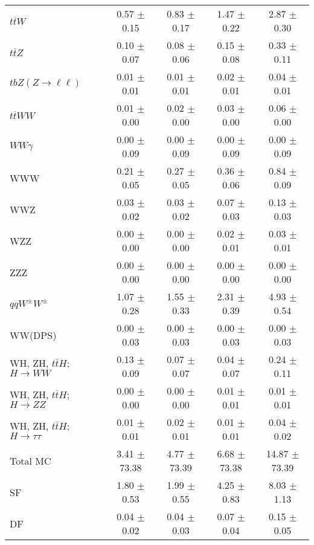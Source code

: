 \begin{tabular}{l|cccc}
                   $t\overline{t}W$ &  0.57 $\pm$  0.15 &  0.83 $\pm$  0.17 &  1.47 $\pm$  0.22 &  2.87 $\pm$  0.30 \\
                   $t\overline{t}Z$ &  0.10 $\pm$  0.07 &  0.08 $\pm$  0.06 &  0.15 $\pm$  0.08 &  0.33 $\pm$  0.11 \\
    $tbZ (Z \rightarrow \ell \ell)$ &  0.01 $\pm$  0.01 &  0.01 $\pm$  0.01 &  0.02 $\pm$  0.01 &  0.04 $\pm$  0.01 \\
                  $t\overline{t}WW$ &  0.01 $\pm$  0.00 &  0.02 $\pm$  0.00 &  0.03 $\pm$  0.00 &  0.06 $\pm$  0.00 \\
                         $WW\gamma$ &  0.00 $\pm$  0.09 &  0.00 $\pm$  0.09 &  0.00 $\pm$  0.09 &  0.00 $\pm$  0.09 \\
                                WWW &  0.21 $\pm$  0.05 &  0.27 $\pm$  0.05 &  0.36 $\pm$  0.06 &  0.84 $\pm$  0.09 \\
                                WWZ &  0.03 $\pm$  0.02 &  0.03 $\pm$  0.02 &  0.07 $\pm$  0.03 &  0.13 $\pm$  0.03 \\
                                WZZ &  0.00 $\pm$  0.00 &  0.00 $\pm$  0.00 &  0.02 $\pm$  0.01 &  0.03 $\pm$  0.01 \\
                                ZZZ &  0.00 $\pm$  0.00 &  0.00 $\pm$  0.00 &  0.00 $\pm$  0.00 &  0.00 $\pm$  0.00 \\
                 $qqW^{\pm}W^{\pm}$ &  1.07 $\pm$  0.28 &  1.55 $\pm$  0.33 &  2.31 $\pm$  0.39 &  4.93 $\pm$  0.54 \\
                            WW(DPS) &  0.00 $\pm$  0.03 &  0.00 $\pm$  0.03 &  0.00 $\pm$  0.03 &  0.00 $\pm$  0.03 \\
WH, ZH, $t\bar{t}H$; $H \rightarrow WW$ &  0.13 $\pm$  0.09 &  0.07 $\pm$  0.07 &  0.04 $\pm$  0.07 &  0.24 $\pm$  0.11 \\
WH, ZH, $t\bar{t}H$; $H \rightarrow ZZ$ &  0.00 $\pm$  0.00 &  0.00 $\pm$  0.00 &  0.01 $\pm$  0.01 &  0.01 $\pm$  0.01 \\
WH, ZH, $t\bar{t}H$; $H \rightarrow \tau\tau$ &  0.01 $\pm$  0.01 &  0.02 $\pm$  0.01 &  0.01 $\pm$  0.01 &  0.04 $\pm$  0.02 \\
\hline\hline
                           Total MC &  3.41 $\pm$ 73.38 &  4.77 $\pm$ 73.39 &  6.68 $\pm$ 73.38 & 14.87 $\pm$ 73.39 \\
\hline
                                 SF &  1.80 $\pm$  0.53 &  1.99 $\pm$  0.55 &  4.25 $\pm$  0.83 &  8.03 $\pm$  1.13 \\
                                 DF &  0.04 $\pm$  0.02 &  0.04 $\pm$  0.03 &  0.07 $\pm$  0.04 &  0.15 $\pm$  0.05 \\

\end{tabular}
